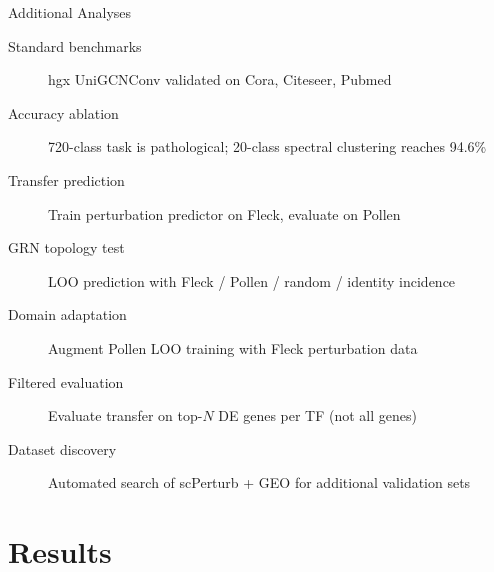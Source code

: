 \documentclass[aspectratio=169,11pt]{beamer}
\begin{document}
\begin{frame}{Additional Analyses}

\begin{description}
    \item[Standard benchmarks] hgx UniGCNConv validated on Cora, Citeseer, Pubmed
    \item[Accuracy ablation] 720-class task is pathological; 20-class spectral clustering reaches 94.6\%
    \item[Transfer prediction] Train perturbation predictor on Fleck, evaluate on Pollen
    \item[GRN topology test] LOO prediction with Fleck / Pollen / random / identity incidence
    \item[Domain adaptation] Augment Pollen LOO training with Fleck perturbation data
    \item[Filtered evaluation] Evaluate transfer on top-$N$ DE genes per TF (not all genes)
    \item[Dataset discovery] Automated search of scPerturb + GEO for additional validation sets
\end{description}

\end{frame}

\section{Results}
\end{document}
